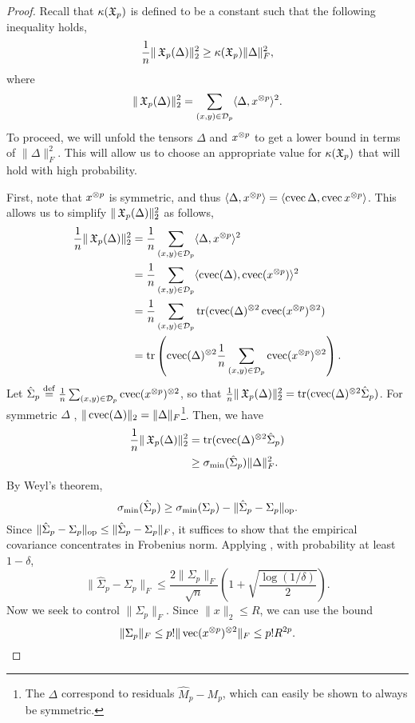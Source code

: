\begin{proof}
  Recall that $\kappa(\operatorname{\mathfrak{X}}_p)$ is defined to be a constant such that the following inequality holds, 
  $$\frac{1}{n} \|\operatorname{\mathfrak{X}}_p(\Delta)\|_2^2 \ge \kappa(\operatorname{\mathfrak{X}}_p) \|\Delta\|^2_F,$$
where
$$\|\operatorname{\mathfrak{X}}_p(\Delta)\|_2^2 = \sum_{(x,y) \in \mathcal{D}_p} \langle \Delta, x^{\otimes p} \rangle^2.$$
To proceed, we will unfold the tensors $\Delta$ and $x^{\otimes p}$ to get a lower bound in terms of $\|\Delta\|^2_F$. This will allow us to choose an appropriate value for $\kappa(\operatorname{\mathfrak{X}}_p)$ that will hold with high probability.

First, note that $x^{\otimes p}$ is symmetric, and thus
$\langle \Delta, x^{\otimes p} \rangle = \langle \operatorname{cvec}{\Delta}, \operatorname{cvec}{x^{\otimes p}} \rangle$.
This allows us to simplify $\|\operatorname{\mathfrak{X}}_p(\Delta)\|_2^2$ as follows,
\begin{align*}
  \frac{1}{n} \|\operatorname{\mathfrak{X}}_p(\Delta)\|_2^2 
    &= \frac{1}{n} \sum_{(x,y) \in \mathcal{D}_p} \langle \Delta, x^{\otimes p} \rangle^2 \\
    &= \frac{1}{n} \sum_{(x,y) \in \mathcal{D}_p} \langle \operatorname{cvec}(\Delta), \operatorname{cvec}(x^{\otimes p}) \rangle^2 \\
    &= \frac{1}{n} \sum_{(x,y) \in \mathcal{D}_p} \operatorname{tr}( \operatorname{cvec}(\Delta)^{\otimes 2} \operatorname{cvec}(x^{\otimes p})^{\otimes 2} ) \\
    &= \operatorname{tr}\left( \operatorname{cvec}(\Delta)^{\otimes 2} \frac{1}{n} \sum_{(x,y) \in \mathcal{D}_p} \operatorname{cvec}(x^{\otimes p})^{\otimes 2} \right).
\end{align*}
Let $\hat\Sigma_p \stackrel{\rm def}{=} \frac{1}{n}
\sum_{(x,y) \in \mathcal{D}_p} \operatorname{cvec}(x^{\otimes p})^{\otimes 2}$, so that $\frac{1}{n}
\|\operatorname{\mathfrak{X}}_p(\Delta)\|_2^2 = \operatorname{tr}(\operatorname{cvec}(\Delta)^{\otimes 2} \hat\Sigma_p)$. 
For symmetric $\Delta$
, $\|\operatorname{cvec}(\Delta)\|_2 = \|\Delta\|_F$\footnote{
The $\Delta$ correspond to residuals $\hat M_p - M_p$, which can easily be shown to always be symmetric.}.
Then, we have 
\begin{align*}
\frac{1}{n} \|\operatorname{\mathfrak{X}}_p(\Delta)\|_2^2 
  &= \operatorname{tr}(\operatorname{cvec}(\Delta)^{\otimes 2} \hat\Sigma_p) \\
  &\ge \sigma_\text{\rm min}(\hat\Sigma_p) \|\Delta\|_F^2.
\end{align*}
By Weyl's theorem, $$\sigma_\text{\rm min}(\hat\Sigma_p) \ge
\sigma_\text{\rm min}(\Sigma_p) - \|\hat\Sigma_p - \Sigma_p\|_{\textrm{op}}.$$
Since $\|\hat\Sigma_p - \Sigma_p\|_{\textrm{op}} \le \|\hat\Sigma_p - \Sigma_p\|_{F}$,
it suffices to show that the empirical covariance concentrates in Frobenius norm.
Applying , with
probability at least $1 - \delta$, $$\| \hat\Sigma_p - \Sigma_p \|_F
\le \frac{2 \|\Sigma_p\|_F}{\sqrt n} \left( 1 + \sqrt{\frac{\log(1/\delta)}{2}} \right).$$
Now we seek to control $\|\Sigma_p\|_F$.
Since $\|x\|_2 \le R$, we can use the
bound $$\| \Sigma_p \|_F \le p! \| \operatorname{vec}(x^{\otimes p})^{\otimes 2} \|_F \le p! R^{2p}.$$


\end{proof}
